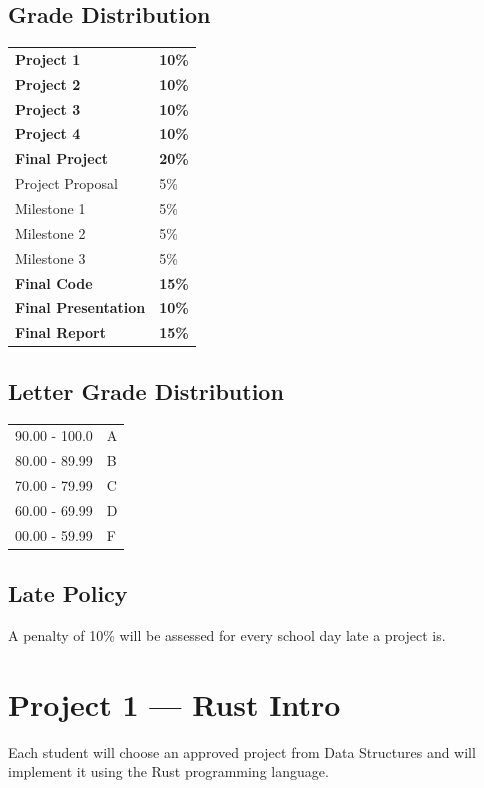 \documentclass[11pt]{article}
\newcommand\tab[1][.5in]{\hspace*{#1}}
\begin{document}
\subsection{Grade Distribution}
\begin{tabular}{ll}
    \textbf{Project 1} & \textbf{10\%} \\
    \textbf{Project 2} & \textbf{10\%} \\
    \textbf{Project 3} & \textbf{10\%} \\
    \textbf{Project 4} & \textbf{10\%} \\
    \textbf{Final Project} & \textbf{20\%} \\
    \tab Project Proposal & 5\% \\
    \tab Milestone 1 & 5\% \\
    \tab Milestone 2 & 5\% \\
    \tab Milestone 3 & 5\% \\
    \textbf{Final Code} & \textbf{15\%} \\
    \textbf{Final Presentation} & \textbf{10\%} \\
    \textbf{Final Report} & \textbf{15\%} \\
\end{tabular}

\subsection{Letter Grade Distribution}
\begin{tabular}{ll}
    90.00 - 100.0 & A \\
    80.00 - 89.99 & B \\
    70.00 - 79.99 & C \\
    60.00 - 69.99 & D \\
    00.00 - 59.99 & F
\end{tabular}

\subsection{Late Policy}
A penalty of 10\% will be assessed for every school day late a project is.

\section{Project 1 --- Rust Intro}
Each student will choose an approved project from Data Structures and will
implement it using the Rust programming language.
\end{document}
